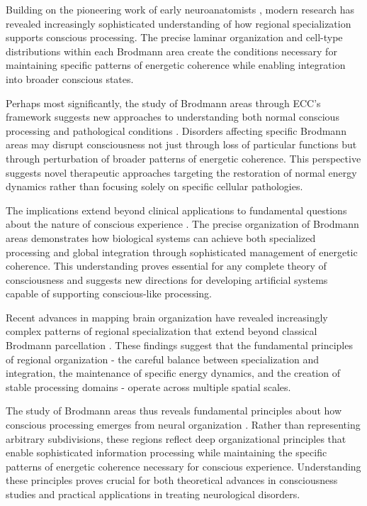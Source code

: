 \begin{refsection}
Building on the pioneering work of early neuroanatomists \cite{Vogt1919}, modern research has revealed increasingly sophisticated understanding of how regional specialization supports conscious processing. The precise laminar organization and cell-type distributions within each Brodmann area create the conditions necessary for maintaining specific patterns of energetic coherence while enabling integration into broader conscious states.

Perhaps most significantly, the study of Brodmann areas through ECC's framework suggests new approaches to understanding both normal conscious processing and pathological conditions \cite{Amunts2015}. Disorders affecting specific Brodmann areas may disrupt consciousness not just through loss of particular functions but through perturbation of broader patterns of energetic coherence. This perspective suggests novel therapeutic approaches targeting the restoration of normal energy dynamics rather than focusing solely on specific cellular pathologies.

The implications extend beyond clinical applications to fundamental questions about the nature of conscious experience \cite{Palomero-Gallagher2019}. The precise organization of Brodmann areas demonstrates how biological systems can achieve both specialized processing and global integration through sophisticated management of energetic coherence. This understanding proves essential for any complete theory of consciousness and suggests new directions for developing artificial systems capable of supporting conscious-like processing.

Recent advances in mapping brain organization have revealed increasingly complex patterns of regional specialization that extend beyond classical Brodmann parcellation \cite{Hawrylycz2012}. These findings suggest that the fundamental principles of regional organization - the careful balance between specialization and integration, the maintenance of specific energy dynamics, and the creation of stable processing domains - operate across multiple spatial scales.

The study of Brodmann areas thus reveals fundamental principles about how conscious processing emerges from neural organization \cite{Eickhoff2018}. Rather than representing arbitrary subdivisions, these regions reflect deep organizational principles that enable sophisticated information processing while maintaining the specific patterns of energetic coherence necessary for conscious experience. Understanding these principles proves crucial for both theoretical advances in consciousness studies and practical applications in treating neurological disorders.


\end{refsection}
